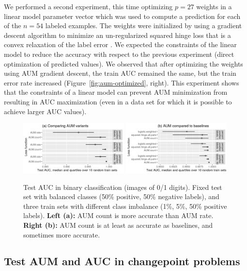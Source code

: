 \documentclass{article}
\begin{document}
We performed a second experiment, this time optimizing  $p=27$ weights in a linear model parameter vector which was used to compute a prediction for each of the $n=54$ labeled examples.
The weights were initialized by using a gradient descent algorithm to minimize an un-regularized squared hinge loss that is a convex relaxation of the label error \citep{Hocking2013icml}.
We expected the constraints of the linear model to reduce the accuracy with respect to the previous experiment (direct optimization of predicted values).
We observed that after optimizing the weights using AUM gradient descent, the train AUC remained the same, but the train error rate increased (Figure~\ref{fig:aum-optimized}, right).
This experiment shows that the constraints of a linear model can prevent AUM minimization from resulting in AUC maximization (even in a data set for which it is possible to achieve larger AUC values).


\begin{figure}[t]
\vskip 0.2in
\begin{center}
 \includegraphics[width=0.49\textwidth]{figure-unbalanced-grad-desc-aum.png}
 \includegraphics[width=0.49\textwidth]{figure-unbalanced-grad-desc.png}
\vskip -0.5cm
\caption{
Test AUC in binary classification (images of 0/1 digits). Fixed test set with balanced classes (50\% positive, 50\% negative labels), and three train sets with different class imbalance (1\%, 5\%, 50\% positive labels). \textbf{Left (a):} AUM count is more accurate than AUM rate. \textbf{Right (b):} AUM count is at least as accurate as baselines, and sometimes more accurate.}
\label{fig:test-binary}
\end{center}
\vskip -0.2in
\end{figure}



\subsection{Test AUM and AUC in changepoint problems}
\end{document}
